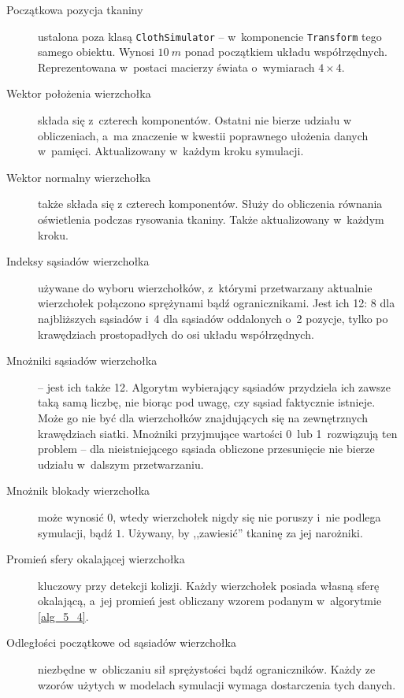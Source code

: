 			\begin{description}
				
				\item[Początkowa pozycja tkaniny] ustalona poza klasą \texttt{ClothSimulator} -- w~komponencie \texttt{Transform} tego samego obiektu. Wynosi \(10\ m\) ponad początkiem układu współrzędnych. Reprezentowana w~postaci macierzy świata o~wymiarach \(4\times4 \).
				
				\item[Wektor położenia wierzchołka] składa się z~czterech komponentów. Ostatni nie bierze udziału w obliczeniach, a~ma znaczenie w kwestii poprawnego ułożenia danych w~pamięci. Aktualizowany w~każdym kroku symulacji.
				
				\item[Wektor normalny wierzchołka] także składa się z czterech komponentów. Służy do obliczenia równania oświetlenia podczas rysowania tkaniny. Także aktualizowany w~każdym kroku.
				
				\item[Indeksy sąsiadów wierzchołka] używane do wyboru wierzchołków, z~którymi przetwarzany aktualnie wierzchołek połączono sprężynami bądź ogranicznikami. Jest ich 12: 8 dla najbliższych sąsiadów i~4 dla sąsiadów oddalonych o~2 pozycje, tylko po krawędziach prostopadłych do osi układu współrzędnych. 
				
				\item[Mnożniki sąsiadów wierzchołka] -- jest ich także 12. Algorytm wybierający sąsiadów przydziela ich zawsze taką samą liczbę, nie biorąc pod uwagę, czy sąsiad faktycznie istnieje. Może go nie być dla wierzchołków znajdujących się na zewnętrznych krawędziach siatki. Mnożniki przyjmujące wartości 0~lub 1~rozwiązują ten problem -- dla nieistniejącego sąsiada obliczone przesunięcie nie bierze udziału w~dalszym przetwarzaniu.
				
				\item[Mnożnik blokady wierzchołka] może wynosić \(0\), wtedy wierzchołek nigdy się nie poruszy i~nie podlega symulacji, bądź \(1\). Używany, by ,,zawiesić'' tkaninę za jej narożniki.
				
				\item[Promień sfery okalającej wierzchołka] kluczowy przy detekcji kolizji. Każdy wierzchołek posiada własną sferę okalającą, a~jej promień jest obliczany wzorem podanym w~algorytmie \ref{alg_5_4}.
				
				\item[Odległości początkowe od sąsiadów wierzchołka] niezbędne w~obliczaniu sił sprężystości bądź ograniczników. Każdy ze wzorów użytych w modelach symulacji wymaga dostarczenia tych danych.
				
			\end{description}
			
